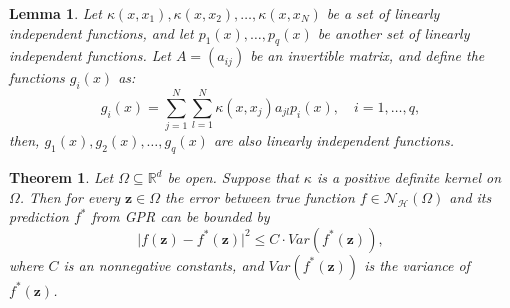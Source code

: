 \documentclass[10pt,a4paper]{amsart}
\newtheorem{thm}{Theorem}
\newtheorem{lem}{Lemma}
\begin{document}
\begin{lem}
	\label{lem_g}
	Let $\kappa(x, x_1), \kappa(x, x_2), \dots, \kappa(x, x_N)$ be a set of linearly independent functions, and let $p_1(x), \dots, p_q(x)$ be another set of linearly independent functions. Let $A = (a_{ij})$ be an invertible matrix, and define the functions $g_i(x)$ as:
	$$
	g_i(x) = \sum_{j=1}^N \sum_{l=1}^N \kappa(x, x_j) a_{jl} p_i(x), \quad i = 1, \dots, q,
	$$
	then, $g_1(x), g_2(x), \dots, g_q(x)$ are also linearly independent functions.
	
	
\end{lem}

\begin{thm}
	\label{thm_GPR_nf}
	Let $\Omega \subseteq \mathbb{R}^d$ be open. Suppose that $\kappa$ is a positive definite kernel on $\Omega$. Then for every $\boldsymbol{z}\in \Omega$ the error between true function $f\in \mathcal{N}_\mathcal{H} (\Omega)$ and its prediction $f^*$ from GPR can be bounded by 
	\begin{equation}
		\vert f(\boldsymbol{z})-f^*(\boldsymbol{z})\vert^2 \le C\cdot Var(f^*(\boldsymbol{z})),
	\end{equation}
	where $C$ is an nonnegative constants, and $Var(f^*(\boldsymbol{z}))$ is the variance of $f^*(\boldsymbol{z})$.
\end{thm}
\end{document}
